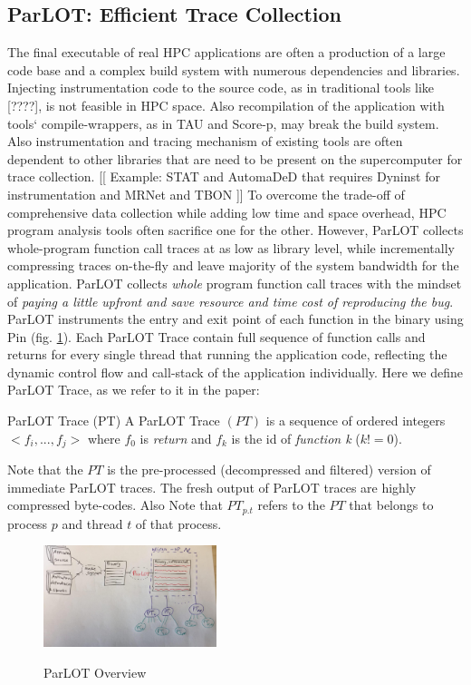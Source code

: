 \subsection{ParLOT: Efficient Trace Collection}
\label{subsec:parlot}

The final executable of real HPC applications are often a production of a large code base and a complex build system with numerous dependencies and libraries. Injecting instrumentation code to the source code, as in traditional tools like [????], is not feasible in HPC space. Also recompilation of the application with tools` compile-wrappers, as in TAU\cite{tau} and Score-p\cite{scorep}, may break the build system. 
Also instrumentation and tracing mechanism of existing tools are often dependent to other libraries that are need to be present on the supercomputer for trace collection. [[ Example: STAT\cite{stat} and AutomaDeD\cite{automaded-laguna} that requires Dyninst\cite{dyninst} for instrumentation and MRNet\cite{mrnet} and TBON \cite{tbon}]]
%
To overcome the trade-off of comprehensive data collection while adding low time and space overhead, HPC program analysis tools often sacrifice one for the other. However, ParLOT collects whole-program function call traces at as low as library level, while incrementally compressing traces on-the-fly and leave majority of the system bandwidth for the application. 
%
ParLOT collects \textit{whole} program function call traces with the mindset of \textit{paying a little upfront and save resource and time cost of reproducing the bug}.
%
ParLOT instruments the entry and exit point of each function in the binary using Pin\cite{pin} (fig. \ref{fig.parlotOverview}). Each ParLOT Trace contain full sequence of function calls and returns for every single thread that running the application code, reflecting the dynamic control flow and call-stack of the application individually.
%
Here we define ParLOT Trace, as we refer to it in the paper:

\begin{definition}{ParLOT Trace (PT)}
A ParLOT Trace $(PT)$ is a sequence of ordered integers $<f_i,...,f_j>$ where $f_0$ is \textit{return} and $f_k$ is the id of \textit{function k} ($k!=0$).
\end{definition}
%
Note that the $PT$ is the pre-processed (decompressed and filtered) version of immediate ParLOT traces. The fresh output of ParLOT traces are highly compressed byte-codes. 
%
Also Note that $PT_{p.t}$ refers to the $PT$ that belongs to process $p$ and thread $t$ of that process.
%
\begin{figure}[t]
\caption{ParLOT Overview}
\includegraphics[width=0.45\textwidth]{figs/parlotOverview.jpg}
\label{fig.parlotOverview}
\end{figure}



